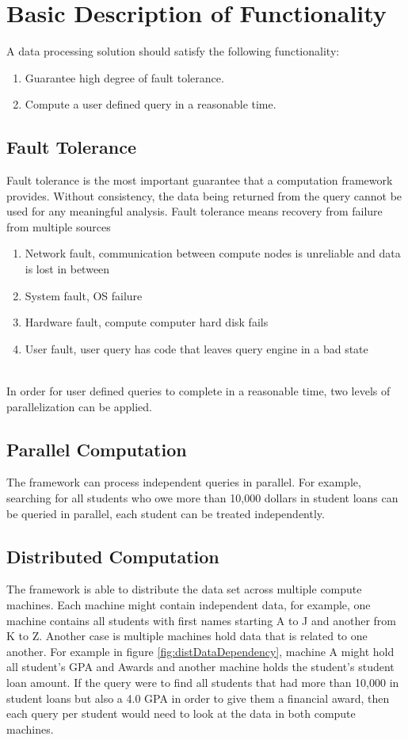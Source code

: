 \documentclass[10pt,twocolumn]{IEEEtran11}
\begin{document}
\section{Basic Description of Functionality}

A data processing solution should satisfy the following functionality:
\begin{enumerate}	
\setlength\itemsep{1em}
	\item Guarantee high degree of fault tolerance.
	\item Compute a user defined query in a reasonable time.
\end{enumerate}

\subsection{Fault Tolerance}
Fault tolerance is the most important guarantee that a computation framework provides.  Without consistency, the data being returned from the query cannot be used for any meaningful analysis. Fault tolerance means recovery from failure from multiple sources
\  \\
\begin{enumerate}
	\setlength\itemsep{1em}
	\item Network fault, communication between compute nodes is unreliable and data is lost in between
	\item System fault, OS failure
	\item Hardware fault, compute computer hard disk fails
	\item User fault, user query has code that leaves query engine in a bad state
\end{enumerate}
\  \\
In order for user defined queries to complete in a reasonable time, two levels of parallelization can be applied.

\subsection{Parallel Computation}
The framework can process independent queries in parallel.  For example, searching for all students who owe more than 10,000 dollars in student loans
can be queried in parallel, each student can be treated independently.

\subsection{Distributed Computation}
The framework is able to distribute the data set across multiple compute machines.  Each machine might contain independent data, for example, one machine contains all students with first names starting A to J and another from K to Z.  Another case is multiple machines hold data that is related to one another.  For example in figure \ref{fig:distDataDependency}, machine A might hold all student's GPA and Awards and another machine holds the student's student loan amount.
If the query were to find all students that had more than 10,000 in student loans but also a 4.0 GPA in order to give them a financial award, then each query per student would need to look at the data in both compute machines.
\end{document}
